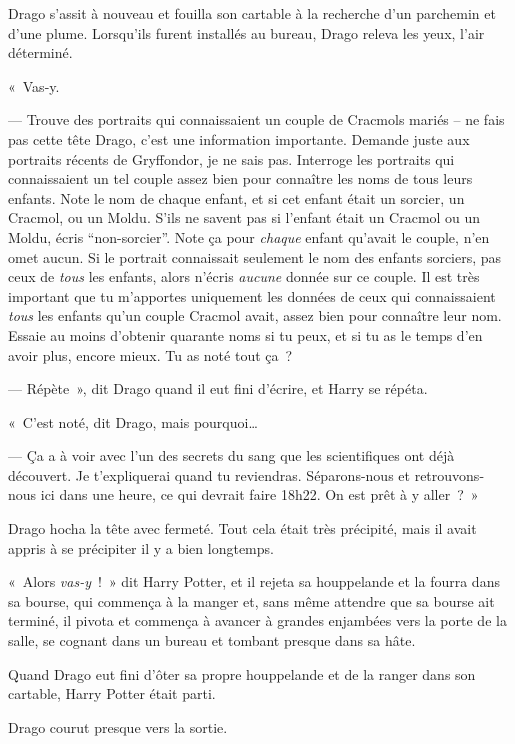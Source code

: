 Drago s'assit à nouveau et fouilla son cartable à la recherche d'un parchemin et d'une plume.
Lorsqu'ils furent installés au bureau, Drago releva les yeux, l'air déterminé.

«~Vas-y.

--- Trouve des portraits qui connaissaient un couple de Cracmols mariés -- ne fais pas cette tête Drago, c'est une information importante.
Demande juste aux portraits récents de Gryffondor, je ne sais pas.
Interroge les portraits qui connaissaient un tel couple assez bien pour connaître les noms de tous leurs enfants.
Note le nom de chaque enfant, et si cet enfant était un sorcier, un Cracmol, ou un Moldu.
S'ils ne savent pas si l'enfant était un Cracmol ou un Moldu, écris “non-sorcier”.
Note ça pour \emph{chaque} enfant qu'avait le couple, n'en omet aucun.
Si le portrait connaissait seulement le nom des enfants sorciers, pas ceux de \emph{tous} les enfants, alors n'écris \emph{aucune} donnée sur ce couple.
Il est très important que tu m'apportes uniquement les données de ceux qui connaissaient \emph{tous} les enfants qu'un couple Cracmol avait, assez bien pour connaître leur nom.
Essaie au moins d'obtenir quarante noms si tu peux, et si tu as le temps d'en avoir plus, encore mieux.
Tu as noté tout ça~?

--- Répète~», dit Drago quand il eut fini d'écrire, et Harry se répéta.

«~C'est noté, dit Drago, mais pourquoi…

--- Ça a à voir avec l'un des secrets du sang que les scientifiques ont déjà découvert.
Je t'expliquerai quand tu reviendras.
Séparons-nous et retrouvons-nous ici dans une heure, ce qui devrait faire 18h22.
On est prêt à y aller~?~»

Drago hocha la tête avec fermeté.
Tout cela était très précipité, mais il avait appris à se précipiter il y a bien longtemps.

«~Alors \emph{vas-y}~!~»
dit Harry Potter, et il rejeta sa houppelande et la fourra dans sa bourse, qui commença à la manger et, sans même attendre que sa bourse ait terminé, il pivota et commença à avancer à grandes enjambées vers la porte de la salle, se cognant dans un bureau et tombant presque dans sa hâte.

Quand Drago eut fini d'ôter sa propre houppelande et de la ranger dans son cartable, Harry Potter était parti.

Drago courut presque vers la sortie.~

